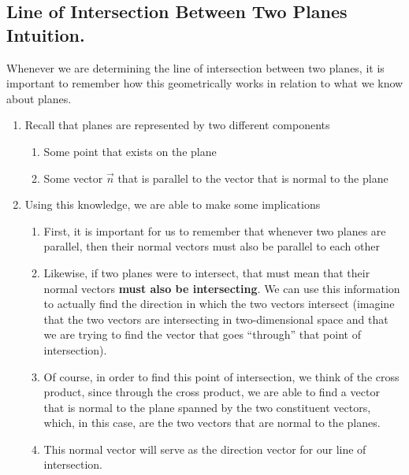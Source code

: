 \documentclass{report}
\begin{document}
\begin{sloppypar}
\begin{center}
{{    }
  }

\end{center}
\subsection{Line of Intersection Between Two Planes Intuition.}
Whenever we are determining the line of intersection
between two planes, it is important to remember how this
geometrically works in relation to what we know about
planes.
\begin{enumerate}
  \item Recall that planes are represented by two
        different components
        \begin{enumerate}
          \item Some point that exists on the plane
          \item Some vector $ \vec{n}$ that
                is parallel to the vector that is
                normal to the plane
        \end{enumerate}
  \item Using this knowledge, we are able to make
        some implications
        \begin{enumerate}
          \item First, it is important for us to
                remember that whenever two planes
                are parallel, then their normal
                vectors must also be parallel to each
                other
          \item Likewise, if two planes
                were to intersect, that must mean
                that their normal vectors \textbf{must
                also be intersecting}. We
                can use this information to
                actually find the direction in
                which the two vectors intersect
                (imagine that the two vectors
                are intersecting in two-dimensional
                space and that we are trying to
                find the vector that goes ``through''
                that point of intersection).
          \item Of course, in order to find
                this point of intersection, we
                think of the cross product,
                since through the cross product,
                we are able to find a vector that is
                normal to the plane spanned
                by the two constituent vectors,
                which, in this case,
                are the two vectors that are normal
                to the planes.
          \item This normal vector will
                serve as the direction vector
                for our line of intersection.


\end{enumerate}
\end{enumerate}
\end{sloppypar}
\end{document}
